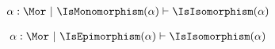 
\begin{sequent}
\begin{align*}
  \alpha:\Mor ~|~ \IsMonomorphism( \alpha ) \vdash \IsIsomorphism( \alpha )
\end{align*}
\end{sequent}

\begin{sequent}
\begin{align*}
  \alpha:\Mor ~|~ \IsEpimorphism( \alpha ) \vdash \IsIsomorphism( \alpha )
\end{align*}
\end{sequent}


